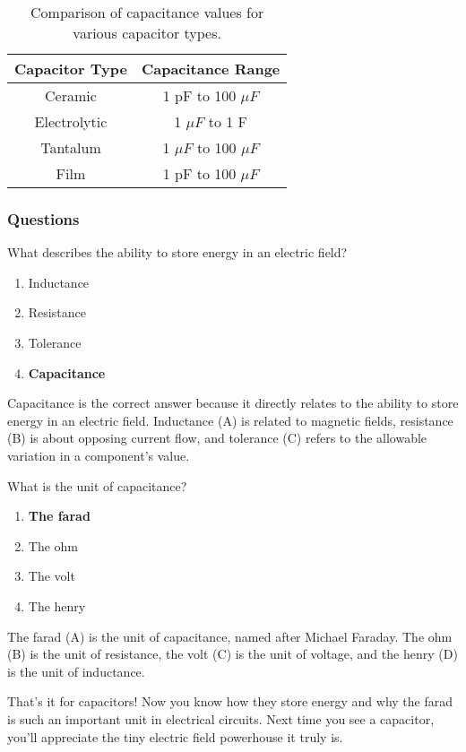 \begin{table}[h]
    \centering
    \begin{tabular}{|c|c|}
        \hline
        \textbf{Capacitor Type} & \textbf{Capacitance Range} \\
        \hline
        Ceramic & 1 pF to 100 \(\mu F\) \\
        Electrolytic & 1 \(\mu F\) to 1 F \\
        Tantalum & 1 \(\mu F\) to 100 \(\mu F\) \\
        Film & 1 pF to 100 \(\mu F\) \\
        \hline
    \end{tabular}
    \caption{Comparison of capacitance values for various capacitor types.}
    \label{tab:capacitance-values}
\end{table}

\subsubsection{Questions}

\begin{tcolorbox}[colback=gray!10!white,colframe=black!75!black,title={T5C01}]
    What describes the ability to store energy in an electric field?
    \begin{enumerate}[label=\Alph*),noitemsep]
        \item Inductance
        \item Resistance
        \item Tolerance
        \item \textbf{Capacitance}
    \end{enumerate}
\end{tcolorbox}

Capacitance is the correct answer because it directly relates to the ability to store energy in an electric field. Inductance (A) is related to magnetic fields, resistance (B) is about opposing current flow, and tolerance (C) refers to the allowable variation in a component's value.

\begin{tcolorbox}[colback=gray!10!white,colframe=black!75!black,title={T5C02}]
    What is the unit of capacitance?
    \begin{enumerate}[label=\Alph*),noitemsep]
        \item \textbf{The farad}
        \item The ohm
        \item The volt
        \item The henry
    \end{enumerate}
\end{tcolorbox}

The farad (A) is the unit of capacitance, named after Michael Faraday. The ohm (B) is the unit of resistance, the volt (C) is the unit of voltage, and the henry (D) is the unit of inductance.

That's it for capacitors! Now you know how they store energy and why the farad is such an important unit in electrical circuits. Next time you see a capacitor, you'll appreciate the tiny electric field powerhouse it truly is.
